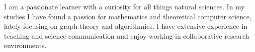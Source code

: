 \documentclass[9pt]{developercv} %
\begin{document}
\vspace{0.5cm}


I am a passionate learner with a curiosity for all things natural sciences. 
In my studies I have found a passion for mathematics and theoretical computer science, lately focusing on graph theory and algorithmics.
I have extensive experience in teaching and science communication and enjoy working in collaborative research environments.




\end{document}
